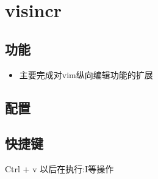 \chapter{visincr}

\section{功能}
\begin{itemize}
    \item 主要完成对vim纵向编辑功能的扩展
\end{itemize}

\section{配置}

\section{快捷键}
Ctrl + v 以后在执行:I等操作

\newpage
